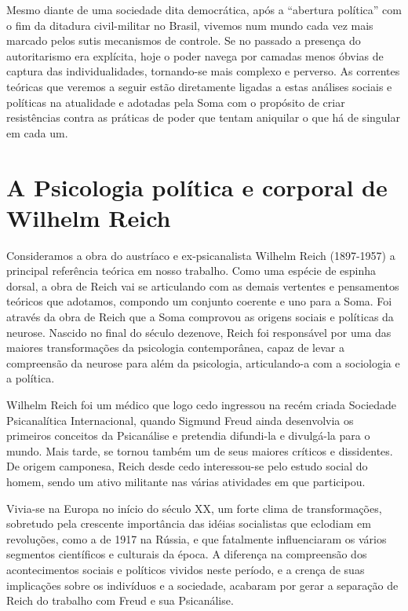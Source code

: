 Mesmo diante de uma sociedade dita democrática, após a ``abertura
política'' com o fim da ditadura civil-militar no Brasil, vivemos num
mundo cada vez mais marcado pelos sutis mecanismos de controle. Se no
passado a presença do autoritarismo era explícita, hoje o poder navega
por camadas menos óbvias de captura das individualidades, tornando-se
mais complexo e perverso. As correntes teóricas que veremos a seguir
estão diretamente ligadas a estas análises sociais e políticas na
atualidade e adotadas pela Soma com o propósito de criar resistências
contra as práticas de poder que tentam aniquilar o que há de singular em
cada um.

\section{A Psicologia política e corporal de Wilhelm Reich}

Consideramos a obra do austríaco e ex-psicanalista Wilhelm Reich
(1897-1957) a principal referência teórica em nosso trabalho. Como uma
espécie de espinha dorsal, a obra de Reich vai se articulando com as
demais vertentes e pensamentos teóricos que adotamos, compondo um
conjunto coerente e uno para a Soma. Foi através da obra de Reich que a
Soma comprovou as origens sociais e políticas da neurose. Nascido no
final do século dezenove, Reich foi responsável por uma das maiores
transformações da psicologia contemporânea, capaz de levar a compreensão
da neurose para além da psicologia, articulando-a com a sociologia e a
política.

Wilhelm Reich foi um médico que logo cedo ingressou na recém criada
Sociedade Psicanalítica Internacional, quando Sigmund Freud ainda
desenvolvia os primeiros conceitos da Psicanálise e pretendia difundi-la
e divulgá-la para o mundo. Mais tarde, se tornou também um de seus
maiores críticos e dissidentes. De origem camponesa, Reich desde cedo
interessou-se pelo estudo social do homem, sendo um ativo militante nas
várias atividades em que participou.

Vivia-se na Europa no início do século XX, um forte clima de
transformações, sobretudo pela crescente importância das idéias
socialistas que eclodiam em revoluções, como a de 1917 na Rússia, e que
fatalmente influenciaram os vários segmentos científicos e culturais da
época. A diferença na compreensão dos acontecimentos sociais e políticos
vividos neste período, e a crença de suas implicações sobre os
indivíduos e a sociedade, acabaram por gerar a separação de Reich do
trabalho com Freud e sua Psicanálise.

